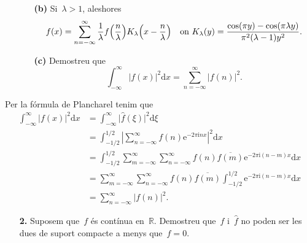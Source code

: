 \documentclass[a4paper]{article}
\theoremstyle{plain}
\theoremstyle{definition}
\newcommand{\iu}{\mathrm{i}}
\newcommand{\e}{\mathrm{e}}
\providecommand{\uppi}{\pi}
\newcommand{\diff}{\mathrm{d}}
\newcommand{\abs}[1]{\lvert{#1}\rvert}
\newcommand{\Abs}[1]{\left\lvert{#1}\right\rvert}
\newcommand{\RR}{\mathbb{R}}
\begin{document}
\begin{enumerate}
    \item[]\begin{enumerate}
        \item[\textbf{(b)}] Si~\(\lambda > 1\), aleshores
            \[
                f(x) =
                \sum_{n=-\infty}^{\infty}
                \frac{1}{\lambda} f\Bigl(\frac{n}{\lambda}\Bigr)
                K_{\lambda}\Bigl(x-\frac{n}{\lambda}\Bigr)
                \quad\text{on}\ %
                K_{\lambda}(y) =
                \frac{\cos(\uppi y) - \cos(\uppi\lambda y)}
                {\uppi^{2}(\lambda-1)y^{2}}.
            \]
    \end{enumerate}
\end{enumerate}


\begin{enumerate}
    \item[]\begin{enumerate}
        \item[\textbf{(c)}] Demostreu que
            \[
                \int_{-\infty}^{\infty}
                \abs{f(x)}^{2}
                \diff x
                =
                \sum_{n=-\infty}^{\infty}
                \abs{f(n)}^{2}.
            \]
    \end{enumerate}
\end{enumerate}

Per la fórmula de Plancharel tenim que
\begin{align*}
    \int_{-\infty}^{\infty}
    \abs{f(x)}^{2}
    \diff x
    &=
    \int_{-\infty}^{\infty}
    \abs{\widehat{f}(\xi)}^{2}
    \diff \xi \\
    &=
    \int_{-1/2}^{1/2}
    \Abs{\sum_{n=-\infty}^{\infty}f(n)\e^{-2\uppi\iu nx}}^{2}
    \diff x \\
    &=
    \int_{-1/2}^{1/2}
    \sum_{m=-\infty}^{\infty}
    \sum_{n=-\infty}^{\infty}
    f(n)
    \overline{f(m)}
    \e^{-2\uppi\iu (n-m)x}
    \diff x \\
    &=
    \sum_{m=-\infty}^{\infty}
    \sum_{n=-\infty}^{\infty}
    f(n)
    \overline{f(m)}
    \int_{-1/2}^{1/2}
    \e^{-2\uppi\iu (n-m)x}
    \diff x \\
    &=
    \sum_{n=-\infty}^{\infty}
    \abs{f(n)}^{2}.
\end{align*}

\begin{enumerate}
    \item[\textbf{2.}] Suposem que~\(f\) és contínua en~\(\RR\).
        Demostreu que~\(f\) i~\(\widehat{f}\) no poden ser les dues de suport
        compacte a menys que~\(f=0\).
\end{enumerate}
\end{document}

